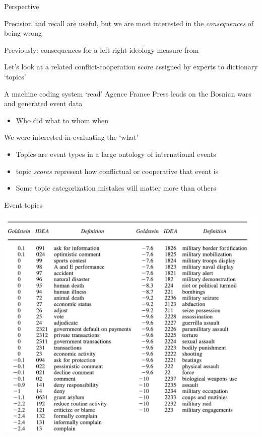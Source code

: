 \documentclass{hertieteaching}
\begin{document}
\begin{frame}{Perspective}

Precision and recall are useful, but we are most interested in the \textit{consequences} of being wrong

Previously: consequences for a left-right ideology measure from \textcite{Laver.Garry2000}


\bigskip

Let's look at a related conflict-cooperation score assigned by experts to dictionary `topics' \parencite{King.Lowe2003}

A machine coding system `read' Agence France Press leads on the Bosnian wars and generated event data
\begin{itemize}
  \item Who did what to whom when
\end{itemize}
We were interested in evaluating the `what'

\begin{itemize}
  \item Topics are event types in a large ontology of international events
  \item topic \textit{scores} represent how conflictual or cooperative that event is
  \item Some topic categorization mistakes will matter more than others
\end{itemize}

	
\end{frame}
\begin{frame}{Event topics}

\centerline{\includegraphics[scale=0.4]{pictures/kinglowe2}}
\end{frame}
\end{document}
